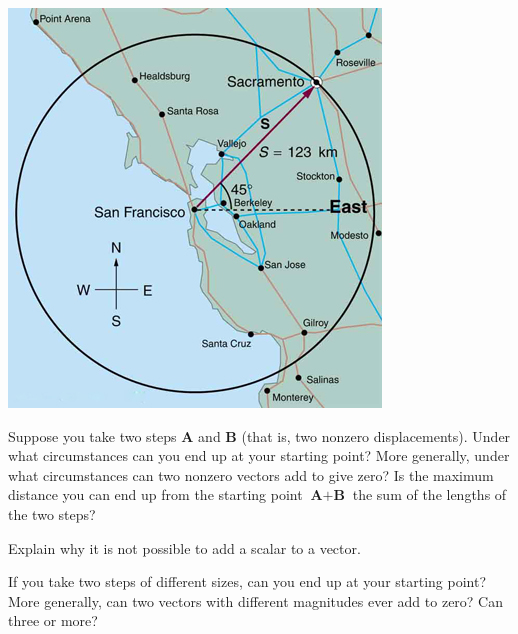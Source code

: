 \documentclass[
]{book}
\newenvironment{conceptual-questions}{}{}
\begin{document}
\begin{conceptual-questions}
\includegraphics{images/Figure_03_02_19a.jpg}

\hypertarget{fs-id1165298754450}{}
\leavevmode\hypertarget{fs-id1165298754451}{}%
Suppose you take two steps \(\textbf{A}\) and \(\textbf{B}\) (that is, two
nonzero displacements). Under what circumstances can you end up at your
starting point? More generally, under what circumstances can two nonzero
vectors add to give zero? Is the maximum distance you can end up from
the starting point \(\textbf{A} + \textbf{B}\) the sum of the lengths of
the two steps?

\hypertarget{fs-id1165298761188}{}
\leavevmode\hypertarget{fs-id1165298993266}{}%
Explain why it is not possible to add a scalar to a vector.

\hypertarget{fs-id1165296242489}{}
\leavevmode\hypertarget{fs-id1165298645243}{}%
If you take two steps of different sizes, can you end up at your
starting point? More generally, can two vectors with different
magnitudes ever add to zero? Can three or more?

\end{conceptual-questions}
\end{document}
